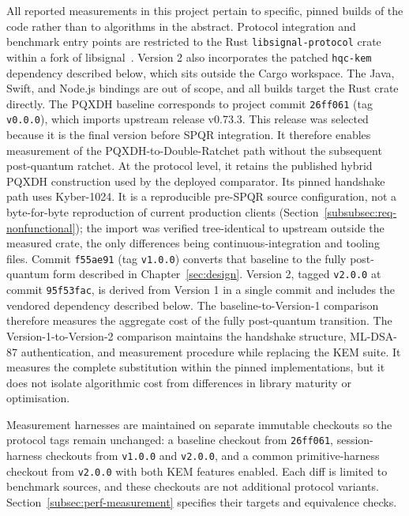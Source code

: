All reported measurements in this project pertain to specific, pinned builds of the code rather than to algorithms in the abstract. Protocol integration and benchmark entry points are restricted to the Rust \texttt{libsignal-protocol} crate within a fork of libsignal~\cite{farrugia_marksaviourpost-quantum-signal-v7_2026}. Version 2 also incorporates the patched \texttt{hqc-kem} dependency described below, which sits outside the Cargo workspace. The Java, Swift, and Node.js bindings are out of scope, and all builds target the Rust crate directly. The PQXDH baseline corresponds to project commit \texttt{26ff061} (tag \texttt{v0.0.0}), which imports upstream release v0.73.3. This release was selected because it is the final version before SPQR integration. It therefore enables measurement of the PQXDH-to-Double-Ratchet path without the subsequent post-quantum ratchet. At the protocol level, it retains the published hybrid PQXDH construction used by the deployed comparator. Its pinned handshake path uses Kyber-1024. It is a reproducible pre-SPQR source configuration, not a byte-for-byte reproduction of current production clients (Section~\ref{subsubsec:req-nonfunctional}); the import was verified tree-identical to upstream outside the measured crate, the only differences being continuous-integration and tooling files. Commit \texttt{f55ae91} (tag \texttt{v1.0.0}) converts that baseline to the fully post-quantum form described in Chapter~\ref{sec:design}. Version 2, tagged \texttt{v2.0.0} at commit \texttt{95f53fac}, is derived from Version 1 in a single commit and includes the vendored dependency described below. The baseline-to-Version-1 comparison therefore measures the aggregate cost of the fully post-quantum transition. The Version-1-to-Version-2 comparison maintains the handshake structure, ML-DSA-87 authentication, and measurement procedure while replacing the KEM suite. It measures the complete substitution within the pinned implementations, but it does not isolate algorithmic cost from differences in library maturity or optimisation.

Measurement harnesses are maintained on separate immutable checkouts so the protocol tags remain unchanged: a baseline checkout from \texttt{26ff061}, session-harness checkouts from \texttt{v1.0.0} and \texttt{v2.0.0}, and a common primitive-harness checkout from \texttt{v2.0.0} with both KEM features enabled. Each diff is limited to benchmark sources, and these checkouts are not additional protocol variants. Section~\ref{subsec:perf-measurement} specifies their targets and equivalence checks.

